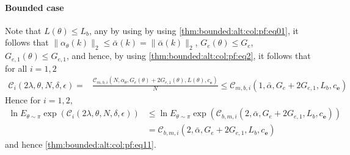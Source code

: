 \documentclass{article}
\newcommand{\e}{\mathbf{e}}
\begin{document}
    \paragraph{Bounded case}
      Note that $L(\theta) \le L_b$,
      any by using 
      by using \eqref{thm:bounded:alt:col:pf:eq01}, it follows that 
       $\|\alpha_{\theta}(k)\|_2 \le \bar{\alpha}(k)=\|\bar{\alpha}(k)\|_2$, $G_e(\theta) \le G_e$, $G_{e,1}(\theta) \le G_{e,1}$, 
      and hence,  by using \eqref{thm:bounded:alt:col:pf:eq2}, it follows that for all $i=1,2$
      \begin{align*}
      \mathcal{C}_i(2\lambda,\theta,N,\delta,\epsilon)=& \frac{\mathcal{C}_{m,b,i}(N,\alpha_{\theta},G_e(\theta)+2G_{e,1}(\theta),L(\theta),c_{\e})}{N} \le \mathcal{C}_{m,b,i}(1,\bar{\alpha},G_e+2G_{e,1},L_b,c_{\e})
      \end{align*}
      Hence for $i=1,2$,
      \begin{align*}
        \ln E_{\theta \sim \pi} \exp(\mathcal{C}_i(2\lambda,\theta,N,\delta,\epsilon)) &\le 
        \ln E_{\theta \sim \pi} \exp(\mathcal{C}_{b,m,i}(2,\bar{\alpha},G_e+2G_{e,1},L_b,c_{\e})) 
        \\
        & = \mathcal{C}_{b,m,i}(2,\bar{\alpha},G_e+2G_{e,1},L_b,c_{\e})
      \end{align*}
      and hence \eqref{thm:bounded:alt:col:pf:eq11}.
\end{document}
